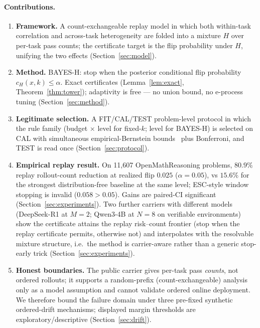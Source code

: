\documentclass{article}
\theoremstyle{definition}
\theoremstyle{remark}
\begin{document}
\paragraph{Contributions.}
\begin{enumerate}[leftmargin=1.6em,itemsep=1pt]
\item \textbf{Framework.} A count-exchangeable replay model in which both
within-task correlation and across-task heterogeneity are folded into a
mixture $H$ over per-task pass counts; the certificate target is the flip
probability under $H$, unifying the two effects (Section~\ref{sec:model}).
\item \textbf{Method.} BAYES-H: stop when the posterior conditional flip
probability $c_H(x,k)\le\alpha$. Exact certificates (Lemma~\ref{lem:exact}, Theorem~\ref{thm:tower}); adaptivity is free --- no union
bound, no e-process tuning (Section~\ref{sec:method}).
\item \textbf{Legitimate selection.} A FIT/CAL/TEST problem-level protocol in
which the rule family (budget $\times$ level for fixed-$k$; level for BAYES-H)
is selected on CAL with simultaneous empirical-Bernstein
bounds~\citep{maurer2009eb} plus Bonferroni, and TEST is read once
(Section~\ref{sec:protocol}).
\item \textbf{Empirical replay result.} On 11{,}607 OpenMathReasoning problems,
$80.9\%$ replay rollout-count reduction at realized flip $0.025$ ($\alpha=0.05$), vs $15.6\%$
for the strongest distribution-free baseline at the same level; ESC-style
window stopping is invalid ($0.058>0.05$). Gains are paired-CI significant
(Section~\ref{sec:experiments}). Two further carriers with different models
(DeepSeek-R1 at $M=2$; Qwen3-4B at $N=8$ on verifiable environments) show the
certificate attains the replay risk--count frontier (stop when the replay
certificate permits, otherwise not)
and interpolates with the resolvable mixture structure, i.e.\ the method is
carrier-aware rather than a generic stop-early trick
(Section~\ref{sec:experiments}).
\item \textbf{Honest boundaries.} The public carrier gives per-task pass
\emph{counts}, not ordered rollouts; it supports a random-prefix
(count-exchangeable) analysis only as a model assumption and cannot validate
ordered online deployment. We therefore bound the failure domain under three
pre-fixed synthetic ordered-drift mechanisms; displayed margin thresholds are
exploratory/descriptive (Section~\ref{sec:drift}).
\end{enumerate}
\end{document}
